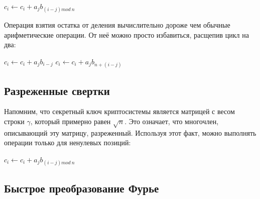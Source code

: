 \documentclass[14pt]{mmcs_article}
\theoremstyle{break}
\begin{document}
\begin{algorithm}[!htpb]
\caption{Циклическая свёртка $c = a \circledast b$}
\begin{algorithmic}[1]
            \State $c_i \leftarrow c_i + a_j b_{(i - j) mod\ n}$
        \EndFor
    \EndFor
\end{algorithmic}
\end{algorithm}

Операция взятия остатка от деления вычислительно дороже чем обычные арифметические операции. От неё можно просто избавиться, расщепив цикл на два:

\begin{algorithm}[!htpb]
\caption{Циклическая свёртка $c = a \circledast b$ без взятия остатка от деления}
\begin{algorithmic}[1]
            \State $c_i \leftarrow c_i + a_j b_{i - j}$
        \EndFor
            \State $c_i \leftarrow c_i + a_j b_{n + (i - j)}$
        \EndFor
    \EndFor
\end{algorithmic}
\end{algorithm}

\subsection{Разреженные свертки}

Напомним, что секретный ключ криптосистемы является матрицей с весом строки $\gamma$, который примерно равен $\sqrt{n}$. Это означает, что многочлен, описывающий эту матрицу, разреженный. Используя этот факт, можно выполнять операции только для ненулевых позиций:

\begin{algorithm}[!h]
\caption{Циклическая свёртка $c = a \circledast b$, где $a$ -- разреженный многочлен}
\begin{algorithmic}[1]
            \State $c_i \leftarrow c_i + a_j b_{(i - j) mod\ n}$
        \EndFor
    \EndFor
\end{algorithmic}
\end{algorithm}

\subsection{Быстрое преобразование Фурье}
\end{document}
